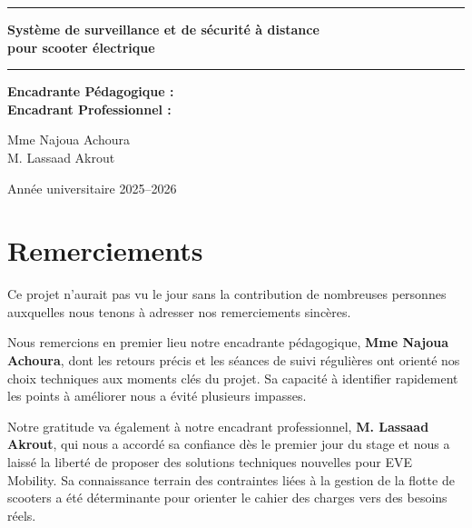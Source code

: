 \documentclass[12pt, a4paper]{report}
\begin{document}
\begin{titlepage}
\begin{center}
    \vspace{0.8cm}
    {\color{isimablue}\rule{\linewidth}{2pt}}

    \vspace{0.4cm}
    {\Large\textbf{Système de surveillance et de sécurité à distance\\pour scooter électrique}}

    \vspace{0.4cm}
    {\color{isimablue}\rule{\linewidth}{2pt}}
  \end{center}

  \vspace{0.8cm}

  \begin{minipage}[t]{0.5\textwidth}
    \textbf{Encadrante Pédagogique :}\\[4pt]
    \textbf{Encadrant Professionnel :}
  \end{minipage}
  \begin{minipage}[t]{0.5\textwidth}
    Mme Najoua Achoura\\[4pt]
    M. Lassaad Akrout
  \end{minipage}

  \vfill

  \begin{center}
    Année universitaire 2025--2026
  \end{center}
\end{titlepage}

\chapter*{Remerciements}
\thispagestyle{fancy}

Ce projet n'aurait pas vu le jour sans la contribution de nombreuses personnes auxquelles
nous tenons à adresser nos remerciements sincères.

Nous remercions en premier lieu notre encadrante pédagogique, \textbf{Mme Najoua Achoura},
dont les retours précis et les séances de suivi régulières ont orienté nos choix
techniques aux moments clés du projet. Sa capacité à identifier rapidement les points
à améliorer nous a évité plusieurs impasses.

Notre gratitude va également à notre encadrant professionnel, \textbf{M. Lassaad Akrout},
qui nous a accordé sa confiance dès le premier jour du stage et nous a laissé la liberté
de proposer des solutions techniques nouvelles pour EVE Mobility. Sa connaissance terrain
des contraintes liées à la gestion de la flotte de scooters a été déterminante pour
orienter le cahier des charges vers des besoins réels.
\end{document}
